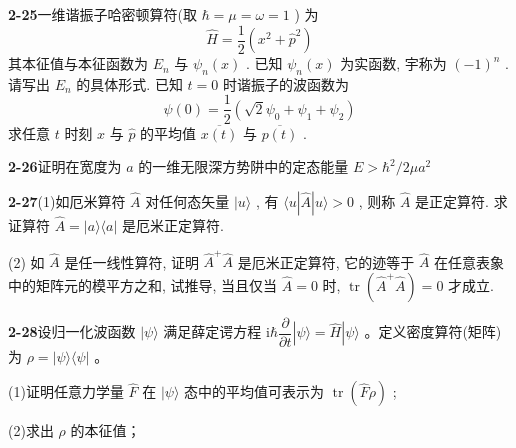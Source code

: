 \vfill

\newpage

\textbf{2-25}\quad 一维谐振子哈密顿算符(取 $\displaystyle \hbar = \mu = \omega = 1$ ) 为
\begin{equation}\tag{1}
\hat {H} = \dfrac {1}{2} (x ^ {2} + \hat {p} ^ {2})
\end{equation}
其本征值与本征函数为 $\displaystyle E_{n}$ 与 $\displaystyle \psi_{n}(x)$ . 已知 $\displaystyle \psi_{n}(x)$ 为实函数, 宇称为 $\displaystyle (-1)^{n}$ . 请写出 $\displaystyle E_{n}$ 的具体形式. 已知 $\displaystyle t = 0$ 时谐振子的波函数为
\begin{equation}\tag{2}
\psi (0) = \dfrac {1}{2} \left(\sqrt {2} \psi_ {0} + \psi_ {1} + \psi_ {2}\right)
\end{equation}
求任意 $\displaystyle t$ 时刻 $\displaystyle x$ 与 $\displaystyle \hat{p}$ 的平均值 $\displaystyle \overline{x(t)}$ 与 $\displaystyle \overline{p(t)}$ .

\vfill

\newpage

\textbf{2-26}\quad 证明在宽度为 $\displaystyle a$ 的一维无限深方势阱中的定态能量 $\displaystyle E > \hbar^2 / 2\mu a^2$

\vfill

\newpage

\textbf{2-27}\quad (1)如厄米算符 $\displaystyle \hat{A}$ 对任何态矢量 $\displaystyle |u\rangle$ , 有 $\displaystyle \langle u|\hat{A}|u\rangle > 0$ , 则称 $\displaystyle \hat{A}$ 是正定算符. 求证算符 $\displaystyle \hat{A} = |a\rangle\langle a|$ 是厄米正定算符.

(2) 如 $\displaystyle \hat{A}$ 是任一线性算符, 证明 $\displaystyle \hat{A}^{+}\hat{A}$ 是厄米正定算符, 它的迹等于 $\displaystyle \hat{A}$ 在任意表象中的矩阵元的模平方之和, 试推导, 当且仅当 $\displaystyle \hat{A} = 0$ 时, $\displaystyle \operatorname{tr}(\hat{A}^{+}\hat{A}) = 0$ 才成立.

\vfill

\newpage

\textbf{2-28}\quad 设归一化波函数 $\displaystyle |\psi\rangle$ 满足薛定谔方程 $\displaystyle \mathrm{i}\hbar \dfrac{\partial}{\partial t} |\psi \rangle = \hat{H} |\psi \rangle$ 。定义密度算符(矩阵)为 $\displaystyle \rho = |\psi\rangle \langle \psi|$ 。

(1)证明任意力学量 $\displaystyle \hat{F}$ 在 $\displaystyle |\psi\rangle$ 态中的平均值可表示为 $\displaystyle \operatorname{tr}(\hat{F}\rho)$ ;

(2)求出 $\displaystyle \rho$ 的本征值；

